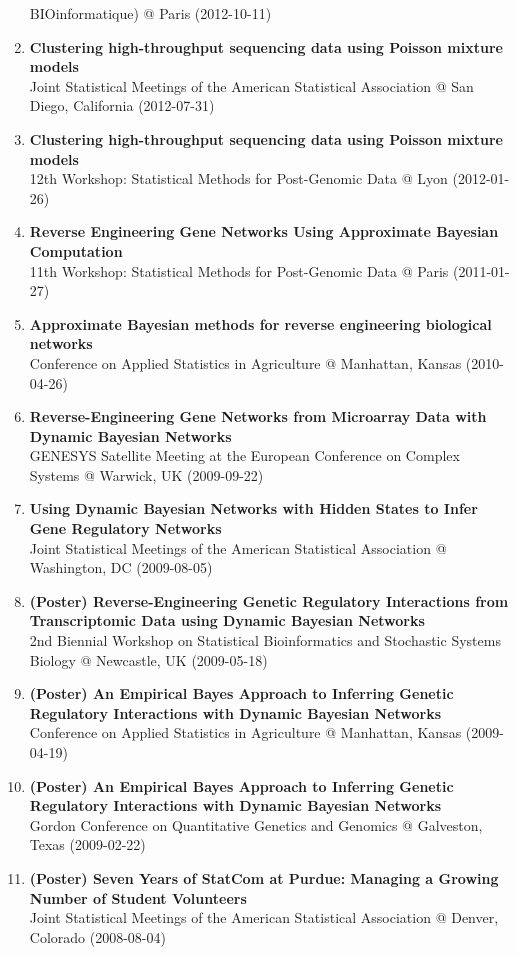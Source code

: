 \documentclass[11pt, a4paper]{awesome-cv}
\begin{document}
\begin{enumerate}
  BIOinformatique) @ Paris (2012-10-11)
\item
  \textbf{Clustering high-throughput sequencing data using Poisson
  mixture models}\\
  Joint Statistical Meetings of the American Statistical Association @
  San Diego, California (2012-07-31)
\item
  \textbf{Clustering high-throughput sequencing data using Poisson
  mixture models}\\
  12th Workshop: Statistical Methods for Post-Genomic Data @ Lyon
  (2012-01-26)
\item
  \textbf{Reverse Engineering Gene Networks Using Approximate Bayesian
  Computation}\\
  11th Workshop: Statistical Methods for Post-Genomic Data @ Paris
  (2011-01-27)
\item
  \textbf{Approximate Bayesian methods for reverse engineering
  biological networks}\\
  Conference on Applied Statistics in Agriculture @ Manhattan, Kansas
  (2010-04-26)
\item
  \textbf{Reverse-Engineering Gene Networks from Microarray Data with
  Dynamic Bayesian Networks}\\
  GENESYS Satellite Meeting at the European Conference on Complex
  Systems @ Warwick, UK (2009-09-22)
\item
  \textbf{Using Dynamic Bayesian Networks with Hidden States to Infer
  Gene Regulatory Networks}\\
  Joint Statistical Meetings of the American Statistical Association @
  Washington, DC (2009-08-05)
\item
  \textbf{(Poster) Reverse-Engineering Genetic Regulatory Interactions
  from Transcriptomic Data using Dynamic Bayesian Networks}\\
  2nd Biennial Workshop on Statistical Bioinformatics and Stochastic
  Systems Biology @ Newcastle, UK (2009-05-18)
\item
  \textbf{(Poster) An Empirical Bayes Approach to Inferring Genetic
  Regulatory Interactions with Dynamic Bayesian Networks}\\
  Conference on Applied Statistics in Agriculture @ Manhattan, Kansas
  (2009-04-19)
\item
  \textbf{(Poster) An Empirical Bayes Approach to Inferring Genetic
  Regulatory Interactions with Dynamic Bayesian Networks}\\
  Gordon Conference on Quantitative Genetics and Genomics @ Galveston,
  Texas (2009-02-22)
\item
  \textbf{(Poster) Seven Years of StatCom at Purdue: Managing a Growing
  Number of Student Volunteers}\\
  Joint Statistical Meetings of the American Statistical Association @
  Denver, Colorado (2008-08-04)
\end{enumerate}
\end{document}
